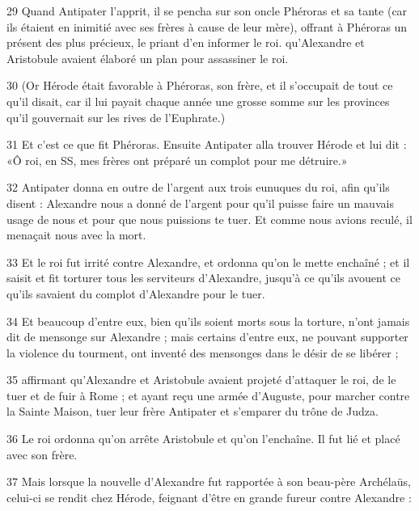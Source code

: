 \par 29 Quand Antipater l'apprit, il se pencha sur son oncle Phéroras et sa tante (car ils étaient en inimitié avec ses frères à cause de leur mère), offrant à Phéroras un présent des plus précieux, le priant d'en informer le roi. qu'Alexandre et Aristobule avaient élaboré un plan pour assassiner le roi.

\par 30 (Or Hérode était favorable à Phéroras, son frère, et il s'occupait de tout ce qu'il disait, car il lui payait chaque année une grosse somme sur les provinces qu'il gouvernait sur les rives de l'Euphrate.)

\par 31 Et c'est ce que fit Phéroras. Ensuite Antipater alla trouver Hérode et lui dit : «Ô roi, en SS, mes frères ont préparé un complot pour me détruire.»

\par 32 Antipater donna en outre de l'argent aux trois eunuques du roi, afin qu'ils disent : Alexandre nous a donné de l'argent pour qu'il puisse faire un mauvais usage de nous et pour que nous puissions te tuer. Et comme nous avions reculé, il menaçait nous avec la mort.

\par 33 Et le roi fut irrité contre Alexandre, et ordonna qu'on le mette enchaîné ; et il saisit et fit torturer tous les serviteurs d'Alexandre, jusqu'à ce qu'ils avouent ce qu'ils savaient du complot d'Alexandre pour le tuer.

\par 34 Et beaucoup d'entre eux, bien qu'ils soient morts sous la torture, n'ont jamais dit de mensonge sur Alexandre ; mais certains d'entre eux, ne pouvant supporter la violence du tourment, ont inventé des mensonges dans le désir de se libérer ;

\par 35 affirmant qu'Alexandre et Aristobule avaient projeté d'attaquer le roi, de le tuer et de fuir à Rome ; et ayant reçu une armée d'Auguste, pour marcher contre la Sainte Maison, tuer leur frère Antipater et s'emparer du trône de Judza.

\par 36 Le roi ordonna qu'on arrête Aristobule et qu'on l'enchaîne. Il fut lié et placé avec son frère.

\par 37 Mais lorsque la nouvelle d'Alexandre fut rapportée à son beau-père Archélaüs, celui-ci se rendit chez Hérode, feignant d'être en grande fureur contre Alexandre :


